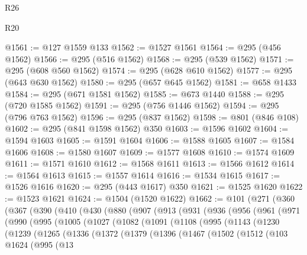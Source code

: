 \begin{lexlean}{R26}
\begin{lexlean}{R20}
\begin{coremodule}
{{{{{{{{{{{{{{{{{{{{{{{{{{{{{{{{{{{{{{{{{{{{{{{{{{{{{{{{{{{{{{{@1561 := @127 @1559 @133
@1562 := @1527 @1561
@1564 := @295 (@456 @1562)
@1566 := @295 (@516 @1562)
@1568 := @295 (@539 @1562)
@1571 := @295 (@608 @560 @1562)
@1574 := @295 (@628 @610 @1562)
@1577 := @295 (@643 @630 @1562)
@1580 := @295 (@657 @645 @1562)
@1581 := @658 @1433
@1584 := @295 (@671 @1581 @1562)
@1585 := @673 @1440
@1588 := @295 (@720 @1585 @1562)
@1591 := @295 (@756 @1446 @1562)
@1594 := @295 (@796 @763 @1562)
@1596 := @295 (@837 @1562)
@1598 := @801 (@846 @108)
@1602 := @295 (@841 @1598 @1562) @350
@1603 := @1596 @1602
@1604 := @1594 @1603
@1605 := @1591 @1604
@1606 := @1588 @1605
@1607 := @1584 @1606
@1608 := @1580 @1607
@1609 := @1577 @1608
@1610 := @1574 @1609
@1611 := @1571 @1610
@1612 := @1568 @1611
@1613 := @1566 @1612
@1614 := @1564 @1613
@1615 := @1557 @1614
@1616 := @1534 @1615
@1617 := @1526 @1616
@1620 := @295 (@443 @1617) @350
@1621 := @1525 @1620
@1622 := @1523 @1621
@1624 := @1504 (@1520 @1622)
@1662 := @101
    (@271
      (@360
        (@367
          (@390
            (@410
              (@430
                (@880
                  (@907
                    (@913
                      (@931
                        (@936
                          (@956
                            (@961
                              (@971
                                (@990
                                  (@995
                                    (@1005
                                      (@1027
                                        (@1082
                                          (@1091
                                            (@1108
                                              (@995
                                                (@1143
                                                  (@1230
                                                    (@1239
                                                      (@1265
                                                        (@1336
                                                          (@1372
                                                            (@1379
                                                              (@1396
                                                                (@1467
                                                                  (@1502
                                                                    (@1512
                                                                      (@103
                                                                        @1624
                                                                        (@995
                                                                          (@13
}}}}}}}}}}}}}}}}}}}}}}}}}}}}}}}}}}}}}}}}}}}}}}}}}}}}}}}}}}}}}}}
\end{coremodule}
\end{lexlean}
\end{lexlean}
